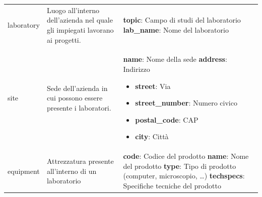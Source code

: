 \begin{longtable}{@{}| p{} | p{} | p{} |}
\begin{minipage}[t]{0.3\textwidth}
	                       \end{minipage}                             \\[175pt]
	\hline
	laboratory           & \begin{minipage}[t]{0.4\textwidth}
		                       \raggedright
		                       Luogo all'interno dell'azienda nel quale gli impiegati lavorano ai progetti.
	                       \end{minipage}
	                     & \begin{minipage}[t]{0.3\textwidth}
		                       \raggedright
		                       \textbf{topic}: Campo di studi del laboratorio\sskip
		                       \textbf{lab\_name}: Nome del laboratorio
	                       \end{minipage}                                                               \\[40pt]
	\hline
	site                 & \begin{minipage}[t]{0.4\textwidth}
		                       \raggedright
		                       Sede dell'azienda in cui possono essere presente i laboratori.
	                       \end{minipage}
	                     & \begin{minipage}[t]{0.3\textwidth}
		                       \raggedright
		                       \textbf{name}: Nome della sede\sskip
		                       \textbf{address}: Indirizzo
		                       \begin{itemize}
			\item \textbf{street}: Via
			\item \textbf{street\_number}: Numero civico
			\item \textbf{postal\_code}: CAP
			\item \textbf{city}: Città
		\end{itemize}
	                       \end{minipage}                                                                               \\[90pt]
	\hline
	equipment            & \begin{minipage}[t]{0.4\textwidth}
		                       \raggedright
		                       Attrezzatura presente all'interno di un laboratorio
	                       \end{minipage}
	                     & \begin{minipage}[t]{0.3\textwidth}
		                       \raggedright
		                       \textbf{code}: Codice del prodotto\sskip
		                       \textbf{name}: Nome del prodotto\sskip
		                       \textbf{type}: Tipo di prodotto (computer, microscopio, \dots)\sskip
		                       \textbf{techspecs}: Specifiche tecniche del prodotto
	                       \end{minipage}                                               \\[70pt]
	\hline
\end{longtable}

